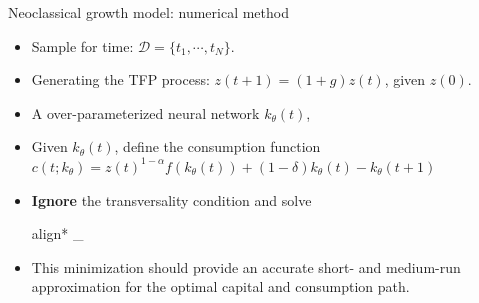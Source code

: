 \documentclass[aspectratio=169,10pt]{beamer}
\newcommand{\emphcolor}[1]{\textbf{\textcolor{emphcolorval}{#1}}}
\begin{document}
\begin{frame}{Neoclassical growth model: numerical method}
	\begin{itemize}
		\item Sample for time:  $\mathcal{D} = \{t_1,\cdots,t_N\}$.
		\vspace{0.05in}
		\item Generating the TFP process: $z(t+1) = (1+g)z(t)$, given $z(0)$.
		\item A over-parameterized neural network $k_\theta(t)$,
		\vspace{0.05in}
		\item Given $k_\theta(t)$, define the consumption function $c(t;k_{\theta}) = z(t)^{1-\alpha}f(k_{\theta}(t)) +(1-\delta)k_{\theta}(t)-k_{\theta}(t+1)
		$
		\vspace{0.05in}
		 \item \emphcolor{Ignore} the transversality condition and solve
			\hspace*{-5mm}
		\begin{empheq}[box=\tcbhighmath]{align*}
			\hspace*{-4mm}
			\min_{\theta \in \Theta}
		\end{empheq}
		\item This minimization should provide an accurate short- and medium-run approximation for the optimal capital and consumption path.
	\end{itemize}
\end{frame}
\end{document}

